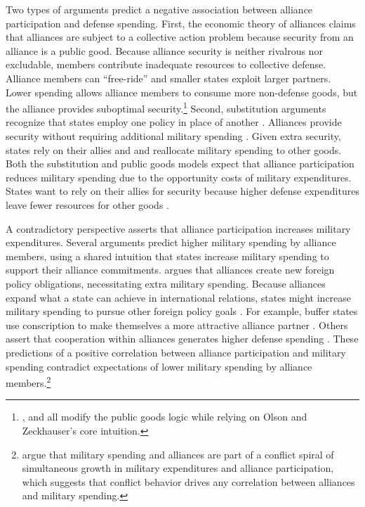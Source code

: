 \documentclass[12pt]{article}
\begin{document}
Two types of arguments predict a negative association between alliance participation and defense spending. 
First, the economic theory of alliances \citep{OlsonZeckhauser1966} claims that alliances are subject to a collective action problem because security from an alliance is a public good.
Because alliance security is neither rivalrous nor excludable, members contribute inadequate resources to collective defense. 
Alliance members can ``free-ride'' and smaller states exploit larger partners. 
Lower spending allows alliance members to consume more non-defense goods, but the alliance provides suboptimal security.\footnote{\citet{SandlerForbes1980}, \citet{Oneal1990} and \citet{SandlerHartley2001} all modify the public goods logic while relying on Olson and Zeckhauser's core intuition.} 
Second, substitution arguments recognize that states employ one policy in place of another \citep{MostStarr1989}.
Alliances provide security without requiring additional military spending \citep{Morrow1993, Conybeare1994}. 
Given extra security, states rely on their allies and and reallocate military spending to other goods. 
Both the substitution and public goods models expect that alliance participation reduces military spending due to the opportunity costs of military expenditures. 
States want to rely on their allies for security because higher defense expenditures leave fewer resources for other goods \citep{Fordham1998, Fearon2018}.


A contradictory perspective asserts that alliance participation increases military expenditures. 
Several arguments predict higher military spending by alliance members, using a shared intuition that states increase military spending to support their alliance commitments. 
\citet{Diehl1994} argues that alliances create new foreign policy obligations, necessitating extra military spending.
Because alliances expand what a state can achieve in international relations, states might increase military spending to pursue other foreign policy goals \citep{MorganPalmer2006}.
For example, buffer states use conscription to make themselves a more attractive alliance partner \citep{Horowitzetal2017}.
Others assert that cooperation within alliances generates higher defense spending \citep{Palmer1990, QuirozFlores2011}. 
These predictions of a positive correlation between alliance participation and military spending contradict expectations of lower military spending by alliance members.\footnote{
\citet{SeneseVasquez2008} argue that military spending and alliances are part of a conflict spiral of simultaneous growth in military expenditures and alliance participation, which suggests that conflict behavior drives any correlation between alliances and military spending. 
}
\end{document}
